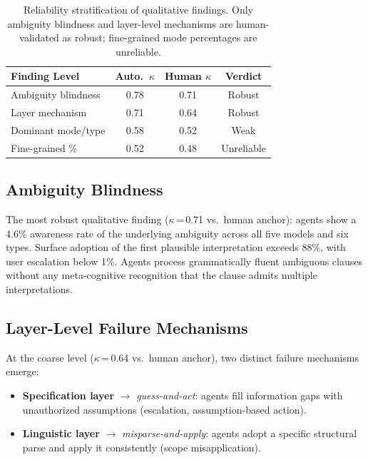\documentclass[11pt]{article}
\begin{document}
\begin{table}[t]
\centering
\small
\begin{tabular}{lccc}
\toprule
\textbf{Finding Level} & \textbf{Auto.\ $\kappa$} & \textbf{Human $\kappa$} & \textbf{Verdict} \\
\midrule
Ambiguity blindness & 0.78 & 0.71 & Robust \\
Layer mechanism & 0.71 & 0.64 & Robust \\
Dominant mode/type & 0.58 & 0.52 & Weak \\
Fine-grained \% & 0.52 & 0.48 & Unreliable \\
\bottomrule
\end{tabular}
\caption{Reliability stratification of qualitative findings. Only ambiguity blindness and layer-level mechanisms are human-validated as robust; fine-grained mode percentages are unreliable.}
\label{tab:c5_reliability}
\end{table}

\subsection{Ambiguity Blindness}

The most robust qualitative finding ($\kappa$\,=\,0.71 vs.\ human anchor): agents show a 4.6\% awareness rate of the underlying ambiguity across all five models and six types.
Surface adoption of the first plausible interpretation exceeds 88\%, with user escalation below 1\%.
Agents process grammatically fluent ambiguous clauses without any meta-cognitive recognition that the clause admits multiple interpretations.

\subsection{Layer-Level Failure Mechanisms}

At the coarse level ($\kappa$\,=\,0.64 vs.\ human anchor), two distinct failure mechanisms emerge:
\begin{itemize}[nosep,leftmargin=*]
  \item \textbf{Specification layer} $\rightarrow$ \emph{guess-and-act}: agents fill information gaps with unauthorized assumptions (escalation, assumption-based action).
  \item \textbf{Linguistic layer} $\rightarrow$ \emph{misparse-and-apply}: agents adopt a specific structural parse and apply it consistently (scope misapplication).
\end{itemize}
\end{document}
